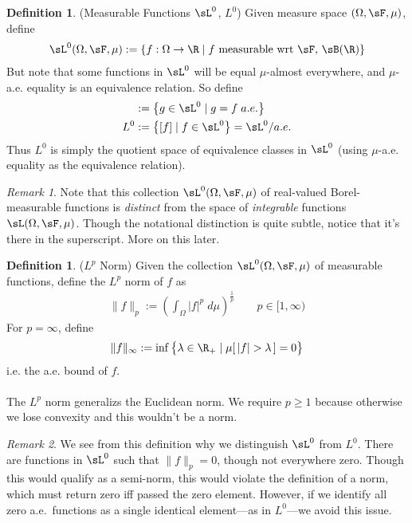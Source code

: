 \documentclass[12pt]{article}
\theoremstyle{plain}
\theoremstyle{definition}
\newtheorem{defn}[thm]{Definition}
\theoremstyle{remark}
\newtheorem*{rmk}{Remark}
\newcommand{\ra}{\rightarrow}
\begin{document}
\begin{defn}(Measurable Functions $\sL^0$, $L^0$)
Given measure space $(\Omega,\sF,\mu)$, define
\begin{align*}
  \sL^0(\Omega,\sF,\mu) :=
  \left\{ f:\Omega\ra\R \; |\; \text{$f$ measurable wrt $\sF$, $\sB(\R)$} \right\}
\end{align*}
But note that some functions in $\sL^0$ will be equal $\mu$-almost
everywhere, and $\mu$-a.e. equality is an equivalence relation. So
define
\begin{align*}
  [f] &:= \left\{ g\in \sL^0 \;|\; g=f \; a.e. \right\} \\
  L^0 &:= \left\{ [f] \;|\; f\in\sL^0 \right\}
  = \sL^0 / a.e.
\end{align*}
Thus $L^0$ is simply the quotient space of equivalence classes in
$\sL^0$ (using $\mu$-a.e. equality as the equivalence relation).
\end{defn}

\begin{rmk}
Note that this collection $\sL^0(\Omega,\sF,\mu)$ of real-valued
Borel-measurable functions is \emph{distinct} from the space of
\emph{integrable} functions $\sL(\Omega,\sF,\mu)$.
Though the notational distinction is quite subtle, notice that it's
there in the superscript. More on this later.
\end{rmk}

\begin{defn}($L^p$ Norm)
Given the collection $\sL^0(\Omega,\sF,\mu)$ of measurable functions,
define the $L^p$ norm of $f$ as
\begin{align*}
  \lVert f\rVert_p := \left(\int_\Omega |f|^p\;d\mu\right)^{\frac{1}{p}}
  \qquad p \in [1,\infty)
\end{align*}
For $p=\infty$, define
\begin{align*}
  \lVert f\rVert_\infty := \inf\big\{\lambda \in\R_+ \;|\; \mu[\,|f|>\lambda\,]=0\big\}
\end{align*}
i.e. the a.e. bound of $f$.
\\
\\
The $L^p$ norm generalizs the Euclidean norm.
We require $p\geq 1$ because otherwise we lose convexity and this
wouldn't be a norm.
\end{defn}
\begin{rmk}
We see from this definition why we distinguish $\sL^0$ from $L^0$.
There are functions in $\sL^0$ such that $\lVert f\rVert_p = 0$, though
not everywhere zero.
Though this would qualify as a semi-norm, this would violate the
definition of a norm, which must return zero iff passed the zero
element.
However, if we identify all zero a.e.\ functions as a single identical
element---as in $L^0$---we avoid this issue.
\end{rmk}
\end{document}
